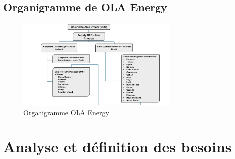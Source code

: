 \documentclass[a4paper, oneside, 12pt, final]{extreport}
\begin{document}
\section{Organigramme de OLA Energy}
\begin{figure}[h]
    \centering
    \includegraphics[width=0.7\textwidth]{Organigramme OLA Energy-1.png} %
    \caption{Organigramme OLA Energy}
    \label{fig:Organigramme OLA Energy}
\end{figure}
\chapter{Analyse et définition des besoins}
\end{document}
